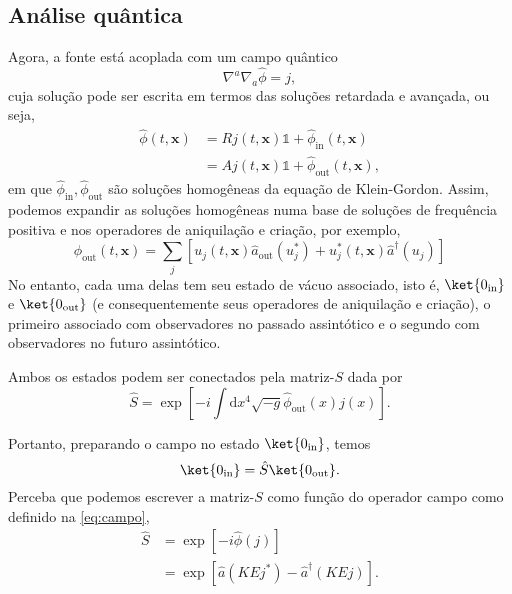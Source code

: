 \documentclass[12pt]{article}
\newcommand{\dd}{\mathrm{d}}
\newcommand{\x}{\mathbf{x}}
\begin{document}
\subsection*{Análise quântica}
Agora, a fonte está acoplada com um campo quântico
\begin{equation}
    \nabla^a\nabla_a\hat{\phi}=j,
\end{equation}
cuja solução pode ser escrita em termos das soluções retardada e avançada, ou seja,
\begin{subequations}
    \begin{align}
        \hat{\phi}(t,\x)&=Rj(t,\x)\mathbb{1}+\hat{\phi}_{\text{in}}(t,\x)\\
        &=Aj(t,\x)\mathbb{1}+\hat{\phi}_{\text{out}}(t,\x),
    \end{align}
\end{subequations}
em que \(\hat{\phi}_{\text{in}},\hat{\phi}_{\text{out}}\) são soluções homogêneas da equação de Klein-Gordon. Assim, podemos expandir as soluções homogêneas numa base de soluções de frequência positiva e nos operadores de aniquilação e criação, por exemplo,
\begin{equation}
    \hat{\phi}_{\text{out}}(t,\x)=\sum_j\left[u_j(t,\x)\hat{a}_{\text{out}}(u_j^*)+u_j^*(t,\x)\hat{a}^{\dagger}(u_j)\right]
\end{equation}
No entanto, cada uma delas tem seu estado de vácuo associado, isto é, \(\ket{0_\text{in}}\) e \(\ket{0_{\text{out}}}\) (e consequentemente seus operadores de aniquilação e criação), o primeiro associado com observadores no passado assintótico e o segundo com observadores no futuro assintótico.

Ambos os estados podem ser conectados pela matriz-\(S\) dada por
\begin{equation}
    \hat{S}=\exp{\left[-i\int\dd x^4\sqrt{-g}\hat{\phi}_{\text{out}}(x)j(x)\right]}.
\end{equation}

Portanto, preparando o campo no estado \(\ket{0_{\text{in}}}\), temos
\begin{equation}
    \ket{0_{\text{in}}}=\hat{S}\ket{0_{\text{out}}}.
\end{equation}
Perceba que podemos escrever a matriz-\(S\) como função do operador campo como definido na \cref{eq:campo},
\begin{subequations}
    \begin{align}
        \hat{S}&=\exp[-i\hat{\phi}(j)]\\
        &=\exp{\left[\hat{a}\left(KEj^*\right)-\hat{a}^{\dagger}\left(KEj\right)\right]}.
    \end{align}
\end{subequations}
\end{document}
